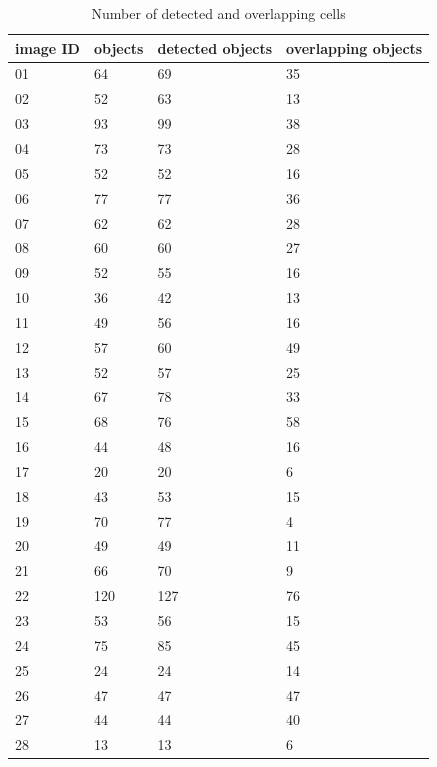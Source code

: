\begin{table}
	\begin{center}

	\caption{Number of detected and overlapping cells}
	\label{tab:Object}
	\begin{tabular}{|p{2cm}|p{2cm}|p{2cm}|p{2cm}|}
	\textbf{image ID} & objects & detected objects & overlapping objects \\
	\hline 
	\hline 
	01 & 64 & 69 & 35 \\
	02 & 52 & 63 & 13 \\
	03 & 93 & 99 & 38 \\
	04 & 73 & 73 & 28 \\
	05 & 52 & 52 & 16 \\
	06 & 77 & 77 & 36 \\
	07 & 62 & 62 & 28 \\
	08 & 60 & 60 & 27 \\
	09 & 52 & 55 & 16 \\
	10 & 36 & 42 & 13 \\
	11 & 49 & 56 & 16 \\
	12 & 57 & 60 & 49 \\
	13 & 52 & 57 & 25 \\
	14 & 67 & 78 & 33 \\
	15 & 68 & 76 & 58 \\
	16 & 44 & 48 & 16 \\
	17 & 20 & 20 & 6 \\
	18 & 43 & 53 & 15 \\
	19 & 70 & 77 & 4 \\
	20 & 49 & 49 & 11 \\
	21 & 66 & 70 & 9 \\
	22 & 120 & 127 & 76 \\
	23 & 53 & 56 & 15 \\
	24 & 75 & 85 & 45 \\
	25 & 24 & 24 & 14 \\
	26 & 47 & 47 & 47 \\
	27 & 44 & 44 & 40 \\
	28 & 13 & 13 & 6 \\
	\hline
	\end{tabular}
	\end{center}
\end{table}

